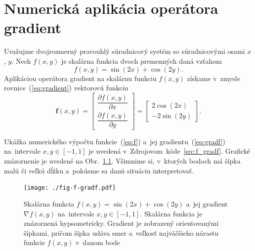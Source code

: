 \documentclass[a4paper, 12pt]{book}
\let\vec\mathbf
\begin{document}

\appendix
\chapter{Numerická aplikácia operátora gradient}
\label{app:numerical_application_of_gradient}

Uvažujme dvojrozmerný pravouhlý súradnicový systém so súradnicovými osami $x$,
$y$.  Nech $f(x, y)$ je skalárna funkcia dvoch premenných daná vzťahom
%
\begin{equation}
\label{eq:f}
f(x, y) = \sin(2x) + \cos(2y){.}
\end{equation}
%
Aplikáciou operátora gradient na skalárnu funkciu $f(x, y)$ získame v~zmysle
rovnice~(\ref{eq:gradient}) vektorovú funkciu
%
\begin{equation}
\label{eq:gradf}
\vec f(x, y) =
\begin{bmatrix}
\dfrac{\partial f(x, y)}{\partial x} \\[2ex]
\dfrac{\partial f(x, y)}{\partial y}
\end{bmatrix}
=
\begin{bmatrix}
2 \cos(2x) \\[2ex]
-2 \sin(2y)
\end{bmatrix}
{.}
\end{equation}

Ukážka numerického výpočtu funkcie~(\ref{eq:f}) a~jej
gradientu~(\ref{eq:gradf}) na~intervale $x, y \in [-1, 1]$ je uvedená
v~Zdrojovom~kóde~\ref{src:f_gradf}.  Grafické znázornenie je uvedené na
Obr.~\ref{fig:f_gradf}.  Všimnime si, v~ktorých bodoch má šípka malú či veľkú
dĺžku a~pokúsme sa danú situáciu interpretovať.



\begin{figure}[bt]
\centering
\texttt{[image: ./fig-f-gradf.pdf]}
\caption{Skalárna funkcia $f(x, y) = \sin(2x) + \cos(2y)$ a~jej gradient
$\nabla f(x, y)$ na~intervale $x, y \in [-1, 1]$.  Skalárna funkcia je
znázornená hypsometricky.  Gradient je zobrazený orientovanými šípkami, pričom
šípka udáva smer a~veľkosť najväčšieho nárastu funkcie $f(x, y)$ v~danom bode}
\label{fig:f_gradf}
\end{figure}
\end{document}
